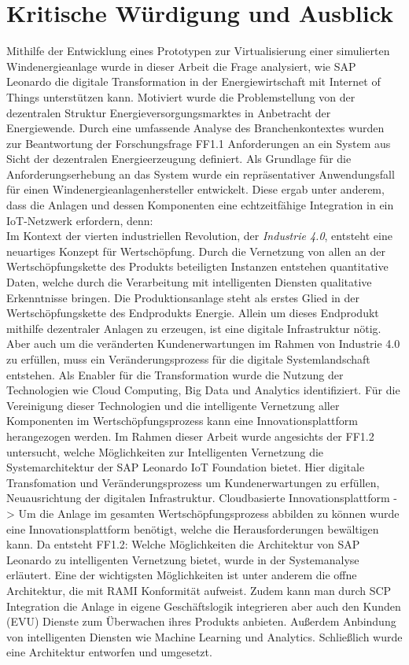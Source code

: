 \section{Kritische Würdigung und Ausblick}

Mithilfe der Entwicklung eines Prototypen zur Virtualisierung einer simulierten Windenergieanlage wurde in dieser Arbeit die Frage analysiert, wie SAP Leonardo die digitale Transformation in der Energiewirtschaft mit Internet of Things unterstützen kann. Motiviert wurde die Problemstellung von der dezentralen Struktur Energieversorgungsmarktes in Anbetracht der Energiewende. Durch eine umfassende Analyse des Branchenkontextes wurden zur Beantwortung der Forschungsfrage FF1.1 Anforderungen an ein System aus Sicht der dezentralen Energieerzeugung definiert. Als Grundlage für die Anforderungserhebung an das System wurde ein repräsentativer Anwendungsfall für einen Windenergieanlagenhersteller entwickelt. Diese ergab unter anderem, dass die Anlagen und dessen Komponenten eine echtzeitfähige Integration in ein IoT-Netzwerk erfordern, denn:
\\Im Kontext der vierten industriellen Revolution, der \textit{Industrie 4.0}, entsteht eine neuartiges Konzept für Wertschöpfung. Durch die Vernetzung von allen an der Wertschöpfungskette des Produkts beteiligten Instanzen entstehen quantitative Daten, welche durch die Verarbeitung mit intelligenten Diensten qualitative Erkenntnisse bringen. Die Produktionsanlage steht als erstes Glied in der Wertschöpfungskette des Endprodukts Energie. Allein um dieses Endprodukt mithilfe dezentraler Anlagen zu erzeugen, ist eine digitale Infrastruktur nötig. Aber auch um die veränderten Kundenerwartungen im Rahmen von Industrie 4.0 zu erfüllen, muss ein Veränderungsprozess für die digitale Systemlandschaft entstehen. Als Enabler für die Transformation wurde die Nutzung der Technologien wie Cloud Computing, Big Data und Analytics identifiziert. Für die Vereinigung dieser Technologien und die intelligente Vernetzung aller Komponenten im Wertschöpfungsprozess kann eine Innovationsplattform herangezogen werden. Im Rahmen dieser Arbeit wurde angesichts der FF1.2 untersucht, welche Möglichkeiten zur Intelligenten Vernetzung die Systemarchitektur der SAP Leonardo IoT Foundation bietet. 
Hier digitale Transfomation und Veränderungsprozess um Kundenerwartungen zu erfüllen, Neuausrichtung der digitalen Infrastruktur. Cloudbasierte Innovationsplattform -> Um die Anlage im gesamten Wertschöpfungsprozess abbilden zu können wurde eine Innovationsplattform benötigt, welche die Herausforderungen bewältigen kann. Da entsteht FF1.2: Welche Möglichkeiten die Architektur von SAP Leonardo zu intelligenten Vernetzung bietet, wurde in der Systemanalyse erläutert. Eine der wichtigsten Möglichkeiten ist unter anderem die offne Architektur, die mit RAMI Konformität aufweist. Zudem kann man durch SCP Integration die Anlage in eigene Geschäftslogik integrieren aber auch den Kunden (EVU) Dienste zum Überwachen ihres Produkts anbieten. Außerdem Anbindung von intelligenten Diensten wie Machine Learning und Analytics. Schließlich wurde eine Architektur entworfen und umgesetzt. 

